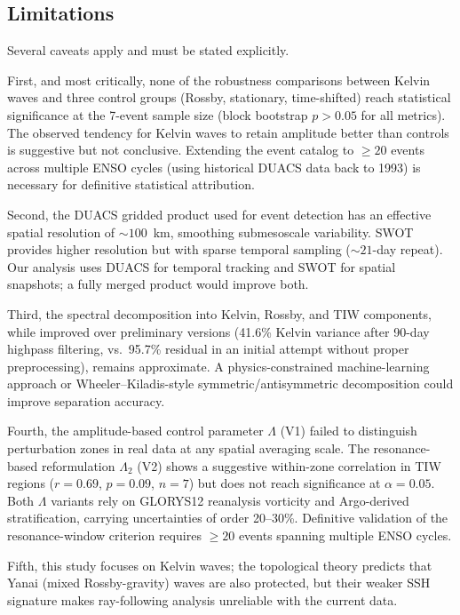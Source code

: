 \documentclass[11pt]{article}
\begin{document}
\subsection{Limitations}

Several caveats apply and must be stated explicitly.

First, and most critically, none of the robustness comparisons between Kelvin waves and three control groups (Rossby, stationary, time-shifted) reach statistical significance at the 7-event sample size (block bootstrap $p > 0.05$ for all metrics). The observed tendency for Kelvin waves to retain amplitude better than controls is suggestive but not conclusive. Extending the event catalog to ${\geq}20$ events across multiple ENSO cycles (using historical DUACS data back to 1993) is necessary for definitive statistical attribution.

Second, the DUACS gridded product used for event detection has an effective spatial resolution of ${\sim}100$~km, smoothing submesoscale variability. SWOT provides higher resolution but with sparse temporal sampling (${\sim}21$-day repeat). Our analysis uses DUACS for temporal tracking and SWOT for spatial snapshots; a fully merged product would improve both.

Third, the spectral decomposition into Kelvin, Rossby, and TIW components, while improved over preliminary versions (41.6\% Kelvin variance after 90-day highpass filtering, vs.\ 95.7\% residual in an initial attempt without proper preprocessing), remains approximate. A physics-constrained machine-learning approach or Wheeler--Kiladis-style symmetric/antisymmetric decomposition could improve separation accuracy.

Fourth, the amplitude-based control parameter $\Lambda$ (V1) failed to distinguish perturbation zones in real data at any spatial averaging scale. The resonance-based reformulation $\Lambda_2$ (V2) shows a suggestive within-zone correlation in TIW regions ($r = 0.69$, $p = 0.09$, $n = 7$) but does not reach significance at $\alpha = 0.05$. Both $\Lambda$ variants rely on GLORYS12 reanalysis vorticity and Argo-derived stratification, carrying uncertainties of order 20--30\%. Definitive validation of the resonance-window criterion requires $\geq 20$ events spanning multiple ENSO cycles.

Fifth, this study focuses on Kelvin waves; the topological theory predicts that Yanai (mixed Rossby-gravity) waves are also protected, but their weaker SSH signature makes ray-following analysis unreliable with the current data.
\end{document}
